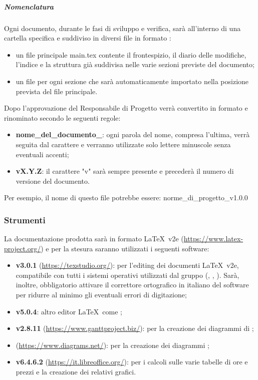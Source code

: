     	\subparagraph{Nomenclatura}
    	Ogni documento, durante le fasi di sviluppo e verifica, sarà all'interno di una cartella specifica e suddiviso in diversi file in formato \glock{\LaTeX}:
    	\begin{itemize}
    		\item un file principale main.tex contente il frontespizio, il diario delle modifiche, l'indice e la struttura già suddivisa nelle varie sezioni previste del documento;
    		\item un file per ogni sezione che sarà automaticamente importato nella posizione prevista del file principale.
    	\end{itemize}
    	Dopo l'approvazione del Responsabile di Progetto verrà convertito in formato  e rinominato secondo le seguenti regole:
    	\begin{itemize}
    		\item \textbf{nome\_del\_documento\_}: ogni parola del nome, compresa l'ultima, verrà seguita dal carattere  e verranno utilizzate solo lettere minuscole senza eventuali accenti;
    		\item \textbf{vX.Y.Z}: il carattere "v" sarà sempre presente e precederà il numero di versione del documento.
    	\end{itemize}
    	Per esempio, il nome di questo file potrebbe essere: norme\_di\_progetto\_v1.0.0

	\subsubsection{Strumenti}
	La documentazione prodotta sarà in formato \LaTeX\ v2e (\url{https://www.latex-project.org/}) e per la stesura saranno utilizzati i seguenti software:
	\begin{itemize}
		\item \textbf{ v3.0.1} (\url{https://texstudio.org/}): per l'editing dei documenti \LaTeX\ v2e, compatibile con tutti i sistemi operativi utilizzati dal gruppo (, , ). Sarà, inoltre, obbligatorio attivare il correttore ortografico in italiano del software per ridurre al minimo gli eventuali errori di digitazione;
		\item \textbf{ v5.0.4}: altro editor \LaTeX\ come ;
		\item \textbf{ v2.8.11} (\url{https://www.ganttproject.biz/}): per la creazione dei diagrammi di ;
		\item \textbf{} (\url{https://www.diagrams.net/}): per la creazione dei diagrammi ;
		\item \textbf{ v6.4.6.2} (\url{https://it.libreoffice.org/}): per i calcoli sulle varie tabelle di ore  e prezzi e la creazione dei relativi grafici.
	\end{itemize}

